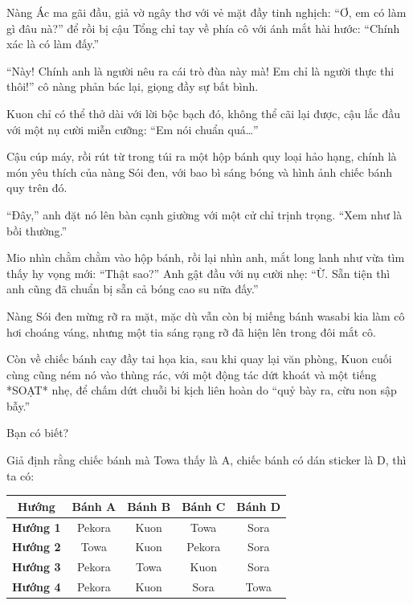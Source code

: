 \documentclass[../main.tex]{subfiles}
\begin{document}
Nàng Ác ma gãi đầu, giả vờ ngây thơ với vẻ mặt đầy tinh nghịch: ``Ơ, em có làm gì đâu nà?'' để rồi bị cậu Tổng chỉ tay về phía cô với ánh mắt hài hước: ``Chính xác là có làm đấy.''

``Này! Chính anh là người nêu ra cái trò đùa này mà! Em chỉ là người thực thi thôi!'' cô nàng phản bác lại, giọng đầy sự bất bình.

Kuon chỉ có thể thở dài với lời bộc bạch đó, không thể cãi lại được, cậu lắc đầu với một nụ cười miễn cưỡng: ``Em nói chuẩn quá\dots''

Cậu cúp máy, rồi rút từ trong túi ra một hộp bánh quy loại hảo hạng, chính là món yêu thích của nàng Sói đen, với bao bì sáng bóng và hình ảnh chiếc bánh quy trên đó.

``Đây,'' anh đặt nó lên bàn cạnh giường với một cử chỉ trịnh trọng. ``Xem như là bồi thường.''

Mio nhìn chằm chằm vào hộp bánh, rồi lại nhìn anh, mắt long lanh như vừa tìm thấy hy vọng mới: ``Thật sao?'' Anh gật đầu với nụ cười nhẹ: ``Ừ. Sẵn tiện thì anh cũng đã chuẩn bị sẵn cả bóng cao su nữa đấy.''

Nàng Sói đen mừng rỡ ra mặt, mặc dù vẫn còn bị miếng bánh wasabi kia làm cô hơi choáng váng, nhưng một tia sáng rạng rỡ đã hiện lên trong đôi mắt cô.

Còn về chiếc bánh cay đầy tai họa kia, sau khi quay lại văn phòng, Kuon cuối cùng cũng ném nó vào thùng rác, với một động tác dứt khoát và một tiếng *SOẠT* nhẹ, để chấm dứt chuỗi bi kịch liên hoàn do ``quỷ bày ra, cừu non sập bẫy.''

\begin{center}{\abv\Large Bạn có biết?}\end{center}

Giả định rằng chiếc bánh mà Towa thấy là A, chiếc bánh có dán sticker là D, thì ta có:

\begin{table}[h!]
  \centering
  \begin{tabular}{|c|c|c|c|c|}
    \hline
    \textbf{Hướng}   & \textbf{Bánh A} & \textbf{Bánh B} & \textbf{Bánh C} & \textbf{Bánh D} \\
    \hline
    \textbf{Hướng 1} & Pekora          & Kuon            & Towa            & Sora            \\
    \hline
    \textbf{Hướng 2} & Towa            & Kuon            & Pekora          & Sora            \\
    \hline
    \textbf{Hướng 3} & Pekora          & Towa            & Kuon            & Sora            \\
    \hline
    \textbf{Hướng 4} & Pekora          & Kuon            & Sora            & Towa            \\
    \hline
  \end{tabular}
\end{table}
\end{document}

